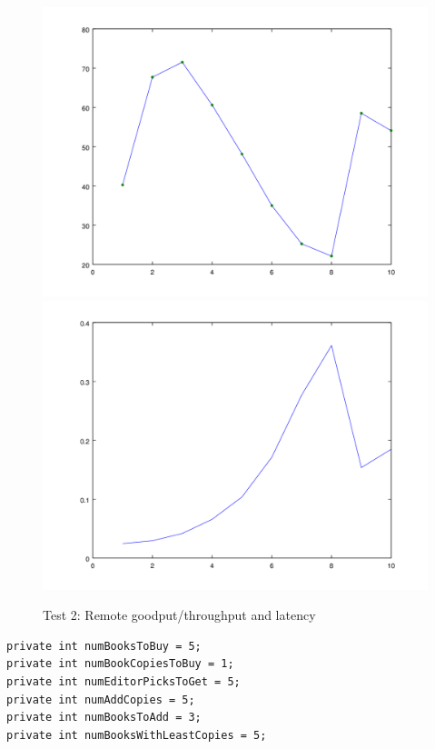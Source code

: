 \documentclass{article}      %
\begin{document}
\begin{figure}[ht]
\centering
 \includegraphics[scale=.33]{graphs/graph4-goodput}
 \includegraphics[scale=.33]{graphs/graph4-latency}
\caption{Test 2: Remote goodput/throughput and latency \label{overflow}}
\end{figure}

\begin{verbatim}
private int numBooksToBuy = 5;
private int numBookCopiesToBuy = 1;
private int numEditorPicksToGet = 5;
private int numAddCopies = 5;
private int numBooksToAdd = 3;
private int numBooksWithLeastCopies = 5;
\end{verbatim}
\end{document}
